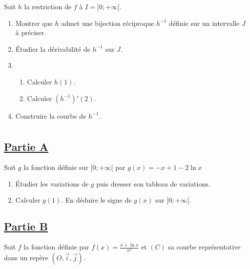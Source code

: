 Soit \( h \) la restriction de \( f \) à \( I =]0; +\infty[ \).

    \begin{enumerate}
        \item Montrer que \( h \) admet une bijection réciproque \( h^{-1} \) définie sur un intervalle \( J \) à préciser.
        \item Étudier la dérivabilité de \( h^{-1} \) sur \( J \).
        \item
              \begin{enumerate}
                  \item Calculer \( h(1) \).
                  \item Calculer \( (h^{-1})'(2) \).
              \end{enumerate}
        \item Construire la courbe de \( h^{-1} \).
    \end{enumerate}

    \section*{}

    \subsection*{\underline{\textbf{Partie A}}}

    Soit \( g \) la fonction définie sur \( ]0; +\infty[ \) par
    \( g(x) = -x + 1 - 2 \ln x \)

    \begin{enumerate}
        \item Étudier les variations de \( g \) puis dresser son tableau de variations.
        \item Calculer \( g(1) \). En déduire le signe de \( g(x) \) sur \( ]0; +\infty[ \).
    \end{enumerate}

    \subsection*{\underline{\textbf{Partie B}}}

    Soit \( f \) la fonction définie par \( f(x) = \frac{x + \ln x}{x^2} \)
    et \( (C) \) sa courbe représentative dans un repère \( (O, \vec{i}, \vec{j}) \).

